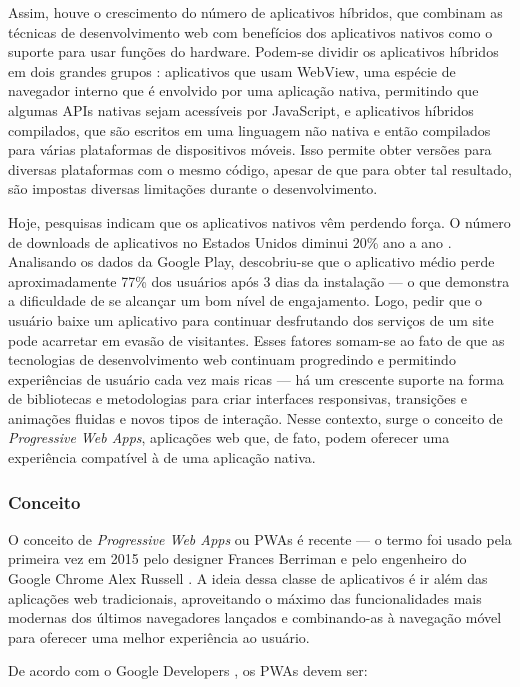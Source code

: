 Assim, houve o crescimento do número de aplicativos híbridos, que combinam as técnicas de desenvolvimento web com benefícios dos aplicativos nativos como o suporte para usar funções do hardware. Podem-se dividir os aplicativos híbridos em dois grandes grupos \cite{rudolph}: aplicativos que usam WebView, uma espécie de navegador interno que é envolvido por uma aplicação nativa, permitindo que algumas APIs nativas sejam acessíveis por JavaScript, e aplicativos híbridos compilados, que são escritos em uma linguagem não nativa e então compilados para várias plataformas de dispositivos móveis. Isso permite obter versões para diversas plataformas com o mesmo código, apesar de que para obter tal resultado, são impostas diversas limitações durante o desenvolvimento.

Hoje, pesquisas indicam que os aplicativos nativos vêm perdendo força. O número de downloads de aplicativos no Estados Unidos diminui 20\% ano a ano \cite{benson}. Analisando os dados da Google Play, descobriu-se que o aplicativo médio perde aproximadamente 77\% dos usuários após 3 dias da instalação \cite{chen} --- o que demonstra a dificuldade de se alcançar um bom nível de engajamento. Logo, pedir que o usuário baixe um aplicativo para continuar desfrutando dos serviços de um site pode acarretar em evasão de visitantes. Esses fatores somam-se ao fato de que as tecnologias de desenvolvimento web continuam progredindo e permitindo experiências de usuário cada vez mais ricas --- há um crescente suporte na forma de bibliotecas e metodologias para criar interfaces responsivas, transições e animações fluidas e novos tipos de interação. Nesse contexto, surge o conceito de \textit{Progressive Web Apps}, aplicações web que, de fato, podem oferecer uma experiência compatível à de uma aplicação nativa.

\subsubsection{Conceito}
O conceito de \textit{Progressive Web Apps} ou PWAs é recente --- o termo foi usado pela primeira vez em 2015 pelo designer Frances Berriman e pelo engenheiro do Google Chrome Alex Russell \cite{russell}. A ideia dessa classe de aplicativos é ir além das aplicações web tradicionais, aproveitando o máximo das funcionalidades mais modernas dos últimos navegadores lançados e combinando-as à navegação móvel para oferecer uma melhor experiência ao usuário.

De acordo com o Google Developers \cite{googledevpwa}, os PWAs devem ser:

